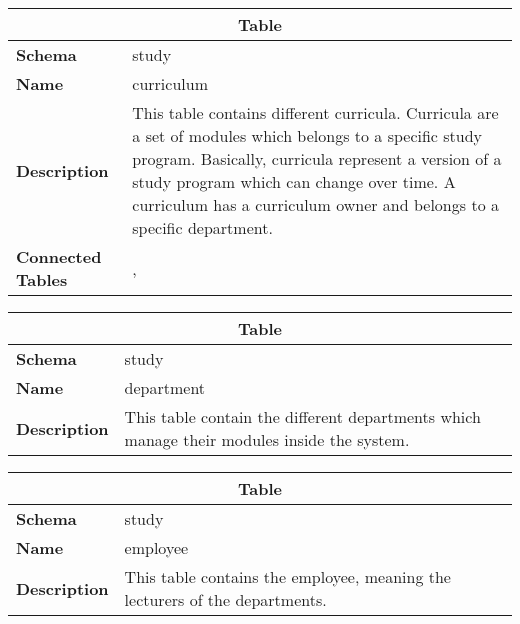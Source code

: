 \begin{table}[H]
	\label{table:curriculum}
	\centering
	\begin{tabular}{|p{}|p{}|}
		\hline
		\multicolumn{2}{|c|}{\textbf{Table}} \\ \hline
		\textbf{Schema}               & study \\ \hline
		\textbf{Name}                 & curriculum \\ \hline
		\textbf{Description}          & This table contains different curricula. Curricula are a set of modules which belongs to a specific study program. Basically, curricula represent a version of a study program which can change over time. A curriculum has a curriculum owner and belongs to a specific department. \\ \hline
		\textbf{Connected Tables}     & \tableref{employee}, \tableref{department} \\ \hline
	\end{tabular}
\end{table}

\begin{table}[H]
	\label{table:department}
	\centering
	\begin{tabular}{|p{}|p{}|}
		\hline
		\multicolumn{2}{|c|}{\textbf{Table}} \\ \hline
		\textbf{Schema}               & study \\ \hline
		\textbf{Name}                 & department \\ \hline
		\textbf{Description}          & This table contain the different departments which manage their modules inside the system. \\ \hline
	\end{tabular}
\end{table}

\begin{table}[H]
	\label{table:employee}
	\centering
	\begin{tabular}{|p{}|p{}|}
		\hline
		\multicolumn{2}{|c|}{\textbf{Table}} \\ \hline
		\textbf{Schema}               & study \\ \hline
		\textbf{Name}                 & employee \\ \hline
		\textbf{Description}          & This table contains the employee, meaning the lecturers of the departments. \\ \hline
	\end{tabular}
\end{table}

